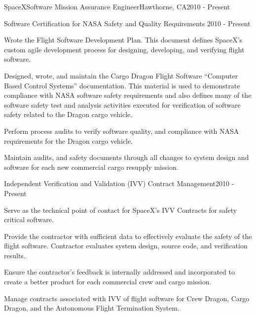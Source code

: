 



\begin{cventries}


  \cventry
  {SpaceX}{Software Mission Assurance Engineer}{Hawthorne, CA}{2010 - Present}
  {}

  \cventry
  {Software Certification for NASA Safety and Quality Requirements}
  {}{}{2010 - Present}
  {
    \begin{cvitems}
    \item Wrote the Flight Software Development Plan. This document
      defines SpaceX's custom agile development process for designing,
      developing, and verifying flight software.
    \item Designed, wrote, and maintain the Cargo Dragon Flight Software
      ``Computer Based Control Systems'' documentation. This material is
      used to demonstrate compliance with NASA software safety
      requirements and also defines many of the software safety test and
      analysis activities executed for verification of software safety
      related to the Dragon cargo vehicle.
    \item Perform process audits to verify software quality, and
      compliance with NASA requirements for the Dragon cargo vehicle.
    \item Maintain audits, and safety documents through all changes to
      system design and software for each new commercial cargo resupply
      mission.
    \end{cvitems}
  }


  \cventry
  {Independent Verification and Validation (IVV) Contract Management}{}{}{2010 - Present}
  {
    \begin{cvitems}
    \item Serve as the technical point of contact for SpaceX's IVV Contracts for
      safety critical software.
    \item Provide the contractor with sufficient data to effectively
      evaluate the safety of the flight software. Contractor evaluates
      system design, source code, and verification results.
    \item Ensure the contractor's feedback is internally addressed and
      incorporated to create a better product for each commercial crew and
      cargo mission.
    \item Manage contracts associated with IVV of flight software for Crew
      Dragon, Cargo Dragon, and the Autonomous Flight Termination
      System.
    \end{cvitems}
  }


\end{cventries}
